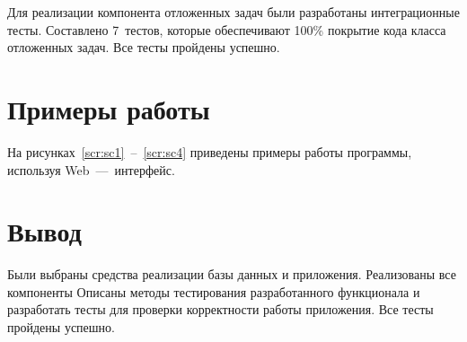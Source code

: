 Для реализации компонента отложенных задач были разработаны интеграционные тесты. Составлено 7~тестов, которые обеспечивают 100\% покрытие кода класса отложенных задач. Все тесты пройдены успешно.

\section{Примеры работы}
На рисунках~\ref{scr:sc1}~--~\ref{scr:sc4} приведены примеры работы программы, используя Web~---~интерфейс.

\FloatBarrier

\section*{Вывод}

Были выбраны средства реализации базы данных и приложения. Реализованы все компоненты Описаны методы тестирования разработанного функционала и разработать тесты для проверки корректности работы приложения. Все тесты пройдены успешно.

\clearpage
